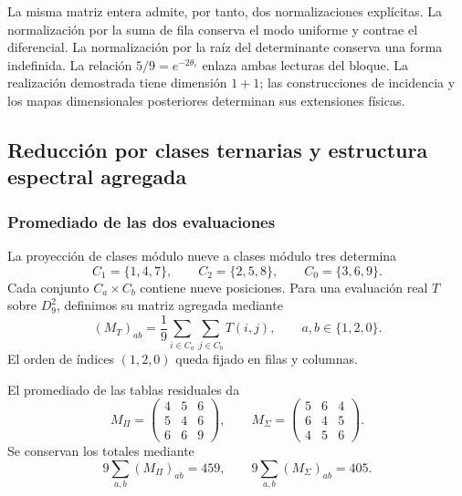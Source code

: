 La misma matriz entera admite, por tanto, dos normalizaciones explícitas. La normalización por la suma de fila conserva el modo uniforme y contrae el diferencial. La normalización por la raíz del determinante conserva una forma indefinida. La relación $5/9=e^{-2\theta_c}$ enlaza ambas lecturas del bloque. La realización demostrada tiene dimensión $1+1$; las construcciones de incidencia y los mapas dimensionales posteriores determinan sus extensiones físicas.

\subsection{Reducción por clases ternarias y estructura espectral agregada}
\label{geo:agregacion}

\subsubsection{Promediado de las dos evaluaciones}

La proyección de clases módulo nueve a clases módulo tres determina
\[
 C_1=\{1,4,7\},\qquad
 C_2=\{2,5,8\},\qquad
 C_0=\{3,6,9\}.
\]
Cada conjunto $C_a\times C_b$ contiene nueve posiciones. Para una evaluación real $T$ sobre $D_9^2$, definimos su matriz agregada mediante
\[
 (M_T)_{ab}=\frac19\sum_{i\in C_a}\sum_{j\in C_b}T(i,j),
 \qquad a,b\in\{1,2,0\}.
\]
El orden de índices $(1,2,0)$ queda fijado en filas y columnas.

\begin{proposicion}
\label{geo:prop-agregadas}
El promediado de las tablas residuales da
\[
 M_\Pi=\begin{pmatrix}4&5&6\\5&4&6\\6&6&9\end{pmatrix},
 \qquad
 M_\Sigma=\begin{pmatrix}5&6&4\\6&4&5\\4&5&6\end{pmatrix}.
\]
Se conservan los totales mediante
\[
 9\sum_{a,b}(M_\Pi)_{ab}=459,
 \qquad9\sum_{a,b}(M_\Sigma)_{ab}=405.
\]
\end{proposicion}

